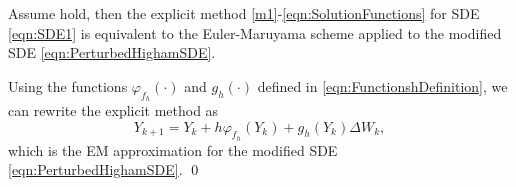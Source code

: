 \begin{corollary}\label{col:SSSMeEMmod}
	Assume  hold, then the 
	explicit \SM method \eqref{m1}-\eqref{eqn:SolutionFunctions} for SDE \eqref{eqn:SDE1} is 
	equivalent to the Euler-Maruyama scheme applied to the modified SDE \eqref{eqn:PerturbedHighamSDE}.
\end{corollary}
\begin{pf}
	Using the functions $\varphi_{f_h}(\cdot)$ and $g_h(\cdot)$ defined in \eqref{eqn:FunctionshDefinition}, 
	we can rewrite the explicit \SM method  as 
	$$
		Y_{k+1} = Y_k + h \varphi_{f_h}(Y_k) + g_h(Y_k)\Delta W_k,
	$$
	which is the EM approximation for the modified SDE \eqref{eqn:PerturbedHighamSDE}. \qed
\end{pf}

